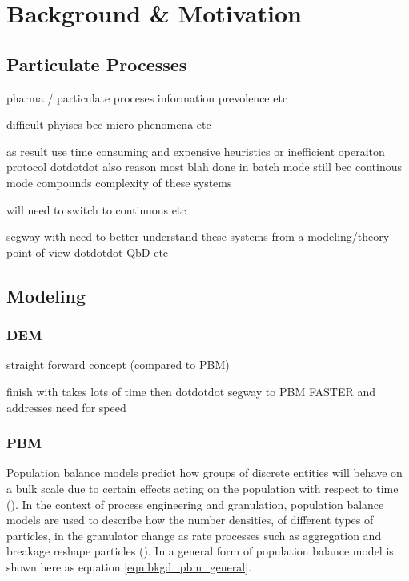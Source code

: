 \documentclass[preprint,11pt,authoryear]{elsarticle}
\begin{document}
	
\section{Background \& Motivation}

  \subsection{Particulate Processes}
  \par pharma / particulate proceses information prevolence etc
  \par difficult phyiscs bec micro phenomena etc 
  \par as result use time consuming and expensive heuristics or inefficient operaiton protocol  dotdotdot also reason most blah done in batch mode still bec continous mode compounds complexity of these systems 
  \par will need to switch to continuous etc 
  \par segway with need to better understand these systems from a modeling/theory point of view dotdotdot QbD etc 
  
  \subsection{Modeling}
    \subsubsection{DEM}
    \par straight forward concept (compared to PBM) 
    
    \par finish with takes lots of time then dotdotdot segway to PBM FASTER and addresses need for speed
    
    \subsubsection{PBM}
    \par Population balance models predict how groups of discrete entities will behave on a bulk scale due to certain effects acting on the population with respect to time (\cite{ramkrishna2014}). In the context of process engineering and granulation, population balance models are used to describe how the number densities, of different types of particles, in the granulator change as rate processes such as aggregation and breakage reshape particles (\cite{Barrasso2013}). In a general form of population balance model is shown here as equation \ref{eqn:bkgd_pbm_general}.
    
\end{document}
